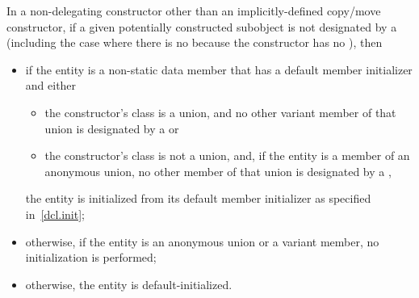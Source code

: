 \pnum
In a non-delegating constructor
other than an implicitly-defined copy/move constructor,
if a given potentially constructed subobject is not designated by a
(including the case where there is no
because the constructor has no
),
then
\begin{itemize}
\item if the entity is a non-static data member that has
a default member initializer and either
\begin{itemize}
\item the constructor's class is a union, and no other variant
member of that union is designated by a  or

\item the constructor's class is not a union, and, if the entity is a member of an
anonymous union, no other member of that union is designated by a
,
\end{itemize}
the entity is initialized from its default member initializer
as specified in~\ref{dcl.init};

\item otherwise, if the entity is an anonymous union or a variant member, no initialization is performed;

\item otherwise, the entity is default-initialized.
\end{itemize}

